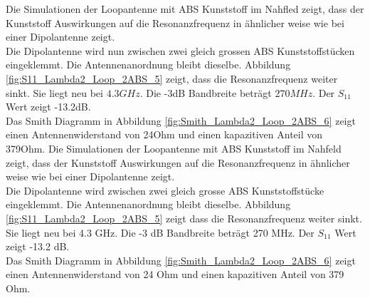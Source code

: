 Die Simulationen der Loopantenne mit ABS Kunststoff im Nahfled  zeigt, dass der Kunststoff  Auswirkungen auf die Resonanzfrequenz in ähnlicher weise wie bei einer Dipolantenne zeigt.\\
Die Dipolantenne wird nun zwischen zwei gleich grossen ABS Kunststoffstücken eingeklemmt. Die Antennenanordnung bleibt dieselbe. Abbildung \ref{fig:S11_Lambda2_Loop_2ABS_5} zeigt, dass die Resonanzfrequenz weiter sinkt. Sie liegt neu bei $4.3GHz$. Die -3dB Bandbreite beträgt $270MHz$. Der $S_{11}$ Wert zeigt -13.2dB.\\
Das Smith Diagramm in Abbildung \ref{fig:Smith_Lambda2_Loop_2ABS_6} zeigt einen Antennenwiderstand von 24Ohm und einen kapazitiven Anteil von 379Ohm.
Die Simulationen der Loopantenne mit ABS Kunststoff im Nahfeld  zeigt, dass der Kunststoff  Auswirkungen auf die Resonanzfrequenz in ähnlicher weise wie bei einer Dipolantenne zeigt.\\
Die Dipolantenne wird zwischen zwei gleich grosse ABS Kunststoffstücke eingeklemmt. Die Antennenanordnung bleibt dieselbe. Abbildung \ref{fig:S11_Lambda2_Loop_2ABS_5} zeigt dass die Resonanzfrequenz weiter sinkt. Sie liegt neu bei 4.3 GHz. Die -3 dB Bandbreite beträgt 270 MHz. Der $S_{11}$ Wert zeigt -13.2 dB.\\
Das Smith Diagramm in Abbildung \ref{fig:Smith_Lambda2_Loop_2ABS_6} zeigt einen Antennenwiderstand von 24 Ohm und einen kapazitiven Anteil von 379 Ohm.



